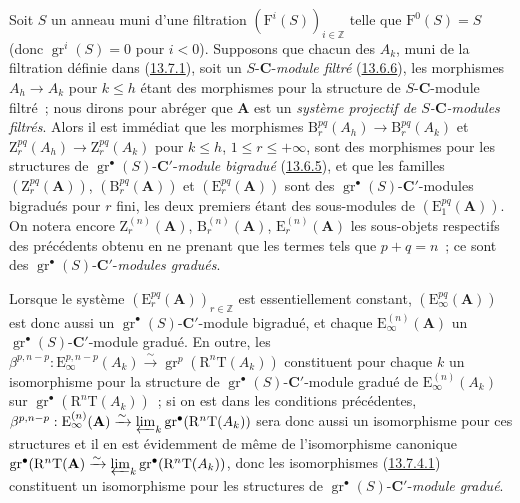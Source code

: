 \begin{env}[13.7.6]
\label{0.13.7.6-fr}
Soit $S$ un anneau muni d'une filtration
$(\mathrm F^i(S))_{i\in\mathbb Z}$ telle que $\mathrm F^0(S)=S$ (donc
$\operatorname{gr}^i(S)=0$ pour $i<0$). Supposons que chacun des $A_k$,
muni de la filtration définie dans
(\hyperref[0.13.7.1-fr]{13.7.1}), soit un $S$-$\boldsymbol{C}$-\emph{module filtré}
(\hyperref[0.13.6.6-fr]{13.6.6}), les morphismes $A_h\to A_k$ pour
$k\leq h$ étant des morphismes pour la structure de $S$-$\boldsymbol{C}$-module
filtré~; nous dirons pour abréger que $\mathbf A$ est un \emph{système
projectif de $S$-$\boldsymbol{C}$-modules filtrés}. Alors il est immédiat que les
morphismes $\mathrm B_r^{pq}(A_h)\to\mathrm B_r^{pq}(A_k)$ et
$\mathrm Z_r^{pq}(A_h)\to\mathrm Z_r^{pq}(A_k)$ pour $k\leq h$,
$1\leq r\leq+\infty$, sont des morphismes pour les structures de
$\operatorname{gr}^\bullet(S)$-$\boldsymbol{C}'$-\emph{module bigradué}
(\hyperref[0.13.6.5-fr]{13.6.5}), et que les familles
$(\mathrm Z_r^{pq}(\mathbf A))$, $(\mathrm B_r^{pq}(\mathbf A))$ et
$(\mathrm E_r^{pq}(\mathbf A))$ sont des
$\operatorname{gr}^\bullet(S)$-$\boldsymbol{C}'$-modules bigradués pour $r$ fini,
les deux premiers étant des sous-modules de
$(\mathrm E_1^{pq}(\mathbf A))$. On notera encore
$\mathrm Z_r^{(n)}(\mathbf A)$, $\mathrm B_r^{(n)}(\mathbf A)$,
$\mathrm E_r^{(n)}(\mathbf A)$ les sous-objets respectifs des précédents
obtenu en ne prenant que les termes tels que $p+q=n$~; ce sont des
$\operatorname{gr}^\bullet(S)$-$\boldsymbol{C}'$-\emph{modules gradués}.

Lorsque le système $(\mathrm E_r^{pq}(\mathbf A))_{r\in\mathbb Z}$ est
essentiellement constant, $(\mathrm E_\infty^{pq}(\mathbf A))$ est donc
aussi un $\operatorname{gr}^\bullet(S)$-$\boldsymbol{C}'$-module bigradué, et chaque
$\mathrm E_\infty^{(n)}(\mathbf A)$ un
$\operatorname{gr}^\bullet(S)$-$\boldsymbol{C}'$-module gradué. En outre, les
$\beta^{p,n-p}:\mathrm E_\infty^{p,n-p}(A_k)\xrightarrow{\sim}
\operatorname{gr}^p(\mathrm R^n\mathrm T(A_k))$ constituent pour chaque
$k$ un isomorphisme pour la structure de
$\operatorname{gr}^\bullet(S)$-$\boldsymbol{C}'$-module gradué de
$\mathrm E_\infty^{(n)}(A_k)$ sur
$\operatorname{gr}^\bullet(\mathrm R^n\mathrm T(A_k))$~; si on est dans
les conditions précédentes,
$\beta^{p,n-p}:\mathrm E_\infty^{(n)}(\mathbf A)\xrightarrow{\sim}
\varprojlim_k\operatorname{gr}^\bullet(\mathrm R^n\mathrm T(A_k))$
sera donc aussi un isomorphisme pour ces structures et il en est
évidemment de même de l'isomorphisme canonique
$\operatorname{gr}^\bullet(\mathrm R^n\mathrm T(\mathbf A)
\xrightarrow{\sim}
\varprojlim_k\operatorname{gr}^\bullet(\mathrm R^n\mathrm T(A_k))$,
donc les isomorphismes
(\hyperref[0.13.7.4.1-fr]{13.7.4.1}) constituent un isomorphisme pour les
structures de $\operatorname{gr}^\bullet(S)$-$\boldsymbol{C}'$-\emph{module gradué}.
\end{env}

